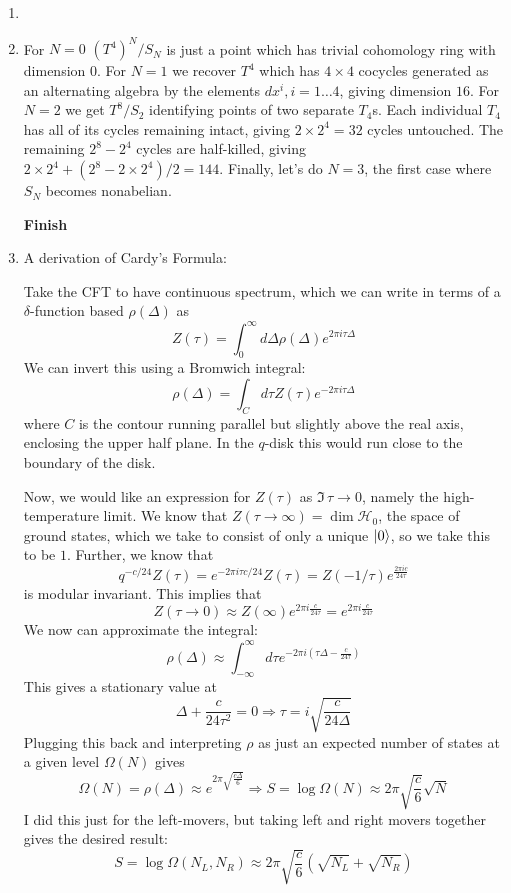 \documentclass[11pt, class=article, crop=false]{standalone}
\begin{document}
\begin{enumerate}
	
	\item 
	
	\item For $N=0$ $(T^4)^N/S_N$ is just a point which has trivial cohomology ring with dimension $0$. For $N=1$ we recover $T^4$ which has $4 \times 4$ cocycles generated as an alternating algebra by the elements $dx^i, i = 1 \dots 4$, giving dimension $16$. For $N=2$ we get $T^{8}/S_2$ identifying points of two separate $T_4$s. Each individual $T_4$ has all of its cycles remaining intact, giving $2 \times 2^4 = 32$ cycles untouched. The remaining $2^8 - 2^4$ cycles are half-killed, giving $2 \times 2^4 + (2^8 - 2 \times 2^4)/2 = 144$.
	Finally, let's do $N=3$, the first case where $S_N$ becomes nonabelian. 
	
	\textbf{Finish}
	
	
	\item A derivation of Cardy's Formula: 
	
	Take the CFT to have continuous spectrum, which we can write in terms of a $\delta$-function based $\rho(\Delta)$ as
	\[
		Z(\tau) = \int_0^\infty d\Delta \rho(\Delta) e^{2 \pi i \tau \Delta}
	\]
	We can invert this using a Bromwich integral:
	\[
		\rho(\Delta) = \int_C d\tau Z(\tau) e^{-2\pi i \tau \Delta}
	\]
	where $C$ is the contour running parallel but slightly above the real axis, enclosing the upper half plane. In the $q$-disk this would run close to the boundary of the disk. 
	
	Now, we would like an expression for $Z(\tau)$ as $\Im \, \tau \to 0$, namely the high-temperature limit. We know that $Z(\tau \to \infty) = \dim \mathcal H_0$, the space of ground states, which we take to consist of only a unique $\ket 0$, so we take this to be $1$. Further, we know that 
	\[
		q^{-c/24} Z(\tau) = e^{-2\pi i \tau c/24} Z(\tau) = Z(-1/\tau) e^{\frac{2\pi i c}{24 \tau}}
	\]
	is modular invariant. This implies that 
	\[
		Z(\tau \to 0) \approx Z(\infty) e^{2 \pi i \frac{c}{24 \tau} } =e^{2 \pi i \frac{c}{24 \tau} } 
	\]
	We now can approximate the integral:
	\[
		\rho(\Delta) \approx \int_{-\infty}^\infty d\tau e^{-2 \pi i (\tau \Delta - \frac{c}{24 \tau})}
	\]
	This gives a stationary value at
	\[
		\Delta + \frac{c}{24 \tau^2} = 0 \Rightarrow \tau = i \sqrt{\frac{c}{24 \Delta}}
	\]
	Plugging this back and interpreting $\rho$ as just an expected number of states at a given level $\Omega(N)$ gives
	\[
		\Omega(N) = \rho(\Delta) \approx e^{2 \pi \sqrt{\frac{c \Delta}{6}}} \Rightarrow S = \log \Omega(N) \approx 2 \pi \sqrt{\frac{c}{6}} \sqrt{N}
	\]
	I did this just for the left-movers, but taking left and right movers together gives the desired result:
	\[
		S = \log \Omega(N_L, N_R) \approx  2 \pi \sqrt{\frac{c}{6}} (\sqrt{N_L} +  \sqrt{N_R})
	\]
	

\end{enumerate}
\end{document}
